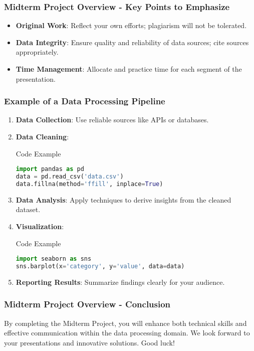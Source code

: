 \documentclass[aspectratio=169]{beamer}
\begin{document}
\begin{frame}[fragile]
    \frametitle{Midterm Project Overview - Key Points to Emphasize}
    \begin{itemize}
        \item \textbf{Original Work}: Reflect your own efforts; plagiarism will not be tolerated.
        \item \textbf{Data Integrity}: Ensure quality and reliability of data sources; cite sources appropriately.
        \item \textbf{Time Management}: Allocate and practice time for each segment of the presentation.
    \end{itemize}
\end{frame}

\begin{frame}[fragile]
    \frametitle{Example of a Data Processing Pipeline}
    \begin{enumerate}
        \item \textbf{Data Collection}: Use reliable sources like APIs or databases.
        \item \textbf{Data Cleaning}:
        \begin{block}{Code Example}
          \begin{lstlisting}[language=python]
import pandas as pd
data = pd.read_csv('data.csv')
data.fillna(method='ffill', inplace=True)
          \end{lstlisting}
        \end{block}
        \item \textbf{Data Analysis}: Apply techniques to derive insights from the cleaned dataset.
        \item \textbf{Visualization}:
        \begin{block}{Code Example}
          \begin{lstlisting}[language=python]
import seaborn as sns
sns.barplot(x='category', y='value', data=data)
          \end{lstlisting}
        \end{block}
        \item \textbf{Reporting Results}: Summarize findings clearly for your audience.
    \end{enumerate}
\end{frame}

\begin{frame}[fragile]
    \frametitle{Midterm Project Overview - Conclusion}
    By completing the Midterm Project,
    you will enhance both technical skills and effective communication within the data processing domain. We look forward to your presentations and innovative solutions. Good luck!
\end{frame}
\end{document}
